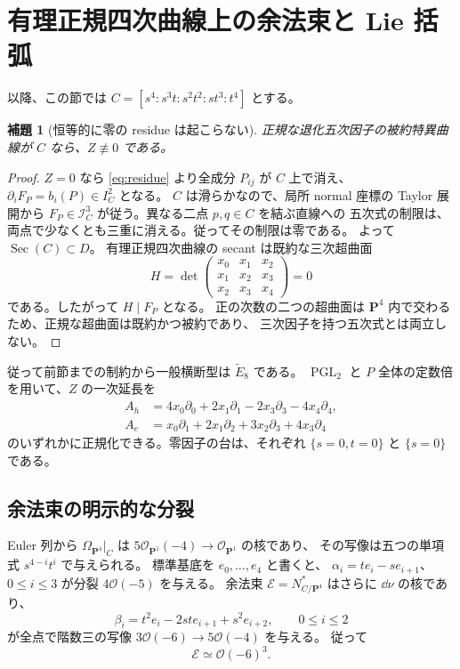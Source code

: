 \documentclass[11pt,a4paper]{ltjsarticle}
\newcommand{\PP}{\mathbf P}\renewcommand{\AA}{\mathbf A}
\newcommand{\OO}{\mathcal O}\newcommand{\FF}{\mathcal F}
\newtheorem{lemma}[theorem]{補題}
\theoremstyle{remark}\newtheorem{remark}[theorem]{注意}
\begin{document}
\section{有理正規四次曲線上の余法束と Lie 括弧}

以降、この節では $C=[s^4:s^3t:s^2t^2:st^3:t^4]$ とする。

\begin{lemma}[恒等的に零の residue は起こらない]\label{lem:zero-residue}
正規な退化五次因子の被約特異曲線が $C$ なら、$Z\not\equiv0$ である。
\end{lemma}
\begin{proof}
$Z=0$ なら \eqref{eq:residue} より全成分 $P_{ij}$ が $C$ 上で消え、
$\partial_iF_P=b_i(P)\in I_C^2$ となる。
$C$ は滑らかなので、局所 normal 座標の Taylor 展開から
$F_P\in\mathcal I_C^3$ が従う。異なる二点 $p,q\in C$ を結ぶ直線への
五次式の制限は、両点で少なくとも三重に消える。従ってその制限は零である。
よって $\operatorname{Sec}(C)\subset D$。
有理正規四次曲線の secant は既約な三次超曲面
\begin{equation}\label{eq:hankel}
 H=\det\begin{pmatrix}x_0&x_1&x_2\\x_1&x_2&x_3\\x_2&x_3&x_4\end{pmatrix}=0
\end{equation}
である。したがって $H\mid F_P$ となる。
正の次数の二つの超曲面は $\PP^4$ 内で交わるため、正規な超曲面は既約かつ被約であり、
三次因子を持つ五次式とは両立しない。
\end{proof}

従って前節までの制約から一般横断型は $\widetilde E_8$ である。
$\operatorname{PGL}_2$ と $P$ 全体の定数倍を用いて、$Z$ の一次延長を
\begin{equation}\label{eq:AhAe}
\begin{split}
 A_h&=4x_0\partial_0+2x_1\partial_1-2x_3\partial_3-4x_4\partial_4,\\
 A_e&=x_0\partial_1+2x_1\partial_2+3x_2\partial_3+4x_3\partial_4
\end{split}
\end{equation}
のいずれかに正規化できる。零因子の台は、それぞれ $\{s=0,t=0\}$ と $\{s=0\}$ である。

\subsection{余法束の明示的な分裂}

Euler 列から $\Omega_{\PP^4}|_C$ は $5\OO_{\PP^1}(-4)\to\OO_{\PP^1}$ の核であり、
その写像は五つの単項式 $s^{4-i}t^i$ で与えられる。
標準基底を $e_0,\ldots,e_4$ と書くと、
$\alpha_i=te_i-se_{i+1}$、$0\le i\le3$ が分裂 $4\OO(-5)$ を与える。
余法束 $\mathcal E=N^*_{C/\PP^4}$ はさらに $\dd\nu$ の核であり、
\begin{equation}\label{eq:beta}
 \beta_i=t^2e_i-2st e_{i+1}+s^2e_{i+2},\qquad 0\le i\le2
\end{equation}
が全点で階数三の写像 $3\OO(-6)\to5\OO(-4)$ を与える。
従って
\[
                         \mathcal E\simeq\OO(-6)^3.
\]
\end{document}
